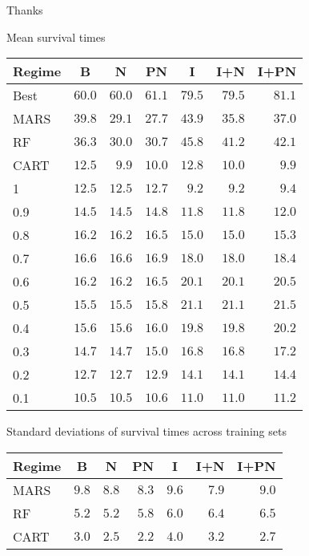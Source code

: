 \documentclass{beamer}
\begin{document}

\begin{frame}[standout]
  Thanks
\end{frame}

\appendix

\begin{frame}[c]{Mean survival times}
  \begin{table}
  \small
  \centering
  \begin{tabular}{lrrrrrr}
  \toprule \multicolumn{1}{c}{Regime}&\multicolumn{1}{c}{B}&\multicolumn{1}{c}{N}&\multicolumn{1}{c}{PN}&\multicolumn{1}{c}{I}&\multicolumn{1}{c}{I+N}&\multicolumn{1}{c}{I+PN}\tabularnewline
  \midrule
  Best&$60.0$&$60.0$&$61.1$&$79.5$&$79.5$&$81.1$\tabularnewline
  MARS&$39.8$&$29.1$&$27.7$&$43.9$&$35.8$&$37.0$\tabularnewline
  RF&$36.3$&$30.0$&$30.7$&$45.8$&$41.2$&$42.1$\tabularnewline
  CART&$12.5$&$ 9.9$&$10.0$&$12.8$&$10.0$&$ 9.9$\tabularnewline
  1&$12.5$&$12.5$&$12.7$&$ 9.2$&$ 9.2$&$ 9.4$\tabularnewline
  0.9&$14.5$&$14.5$&$14.8$&$11.8$&$11.8$&$12.0$\tabularnewline
  0.8&$16.2$&$16.2$&$16.5$&$15.0$&$15.0$&$15.3$\tabularnewline
  0.7&$16.6$&$16.6$&$16.9$&$18.0$&$18.0$&$18.4$\tabularnewline
  0.6&$16.2$&$16.2$&$16.5$&$20.1$&$20.1$&$20.5$\tabularnewline
  0.5&$15.5$&$15.5$&$15.8$&$21.1$&$21.1$&$21.5$\tabularnewline
  0.4&$15.6$&$15.6$&$16.0$&$19.8$&$19.8$&$20.2$\tabularnewline
  0.3&$14.7$&$14.7$&$15.0$&$16.8$&$16.8$&$17.2$\tabularnewline
  0.2&$12.7$&$12.7$&$12.9$&$14.1$&$14.1$&$14.4$\tabularnewline
  0.1&$10.5$&$10.5$&$10.6$&$11.0$&$11.0$&$11.2$\tabularnewline
  \bottomrule
  \end{tabular}
  \end{table}
\end{frame}

\begin{frame}{Standard deviations of survival times across training sets}
  \begin{table}[!htbp]
  \centering
  \begin{tabular}{lrrrrrr}
  \toprule \multicolumn{1}{c}{Regime}&\multicolumn{1}{c}{B}&\multicolumn{1}{c}{N}&\multicolumn{1}{c}{PN}&\multicolumn{1}{c}{I}&\multicolumn{1}{c}{I+N}&\multicolumn{1}{c}{I+PN}\tabularnewline
  \midrule
  MARS&$9.8$&$8.8$&$8.3$&$9.6$&$7.9$&$9.0$\tabularnewline
  RF&$5.2$&$5.2$&$5.8$&$6.0$&$6.4$&$6.5$\tabularnewline
  CART&$3.0$&$2.5$&$2.2$&$4.0$&$3.2$&$2.7$\tabularnewline
  \bottomrule
  \end{tabular}
  \end{table}
\end{frame}
\end{document}
